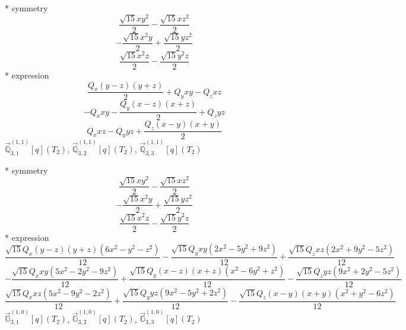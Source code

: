 \documentclass[fleqn,8pt]{jsarticle}
\begin{document}
\noindent\quad ** symmetry
\begin{dmath*}
\frac{\sqrt{15} x y^{2}}{2} - \frac{\sqrt{15} x z^{2}}{2}
\end{dmath*}
\begin{dmath*}
- \frac{\sqrt{15} x^{2} y}{2} + \frac{\sqrt{15} y z^{2}}{2}
\end{dmath*}
\begin{dmath*}
\frac{\sqrt{15} x^{2} z}{2} - \frac{\sqrt{15} y^{2} z}{2}
\end{dmath*}
\noindent\quad ** expression
\begin{dmath*}
\frac{Q_{x} \left(y - z\right) \left(y + z\right)}{2} + Q_{y} x y - Q_{z} x z
\end{dmath*}
\begin{dmath*}
- Q_{x} x y - \frac{Q_{y} \left(x - z\right) \left(x + z\right)}{2} + Q_{z} y z
\end{dmath*}
\begin{dmath*}
Q_{x} x z - Q_{y} y z + \frac{Q_{z} \left(x - y\right) \left(x + y\right)}{2}
\end{dmath*}
\noindent\quad $\vec{\mathbb{Q}}_{3,1}^{(1,1)}[q](T_{2})$, $\vec{\mathbb{Q}}_{3,2}^{(1,1)}[q](T_{2})$, $\vec{\mathbb{Q}}_{3,3}^{(1,1)}[q](T_{2})$

\noindent\quad ** symmetry
\begin{dmath*}
\frac{\sqrt{15} x y^{2}}{2} - \frac{\sqrt{15} x z^{2}}{2}
\end{dmath*}
\begin{dmath*}
- \frac{\sqrt{15} x^{2} y}{2} + \frac{\sqrt{15} y z^{2}}{2}
\end{dmath*}
\begin{dmath*}
\frac{\sqrt{15} x^{2} z}{2} - \frac{\sqrt{15} y^{2} z}{2}
\end{dmath*}
\noindent\quad ** expression
\begin{dmath*}
\frac{\sqrt{15} Q_{x} \left(y - z\right) \left(y + z\right) \left(6 x^{2} - y^{2} - z^{2}\right)}{12} - \frac{\sqrt{15} Q_{y} x y \left(2 x^{2} - 5 y^{2} + 9 z^{2}\right)}{12} + \frac{\sqrt{15} Q_{z} x z \left(2 x^{2} + 9 y^{2} - 5 z^{2}\right)}{12}
\end{dmath*}
\begin{dmath*}
- \frac{\sqrt{15} Q_{x} x y \left(5 x^{2} - 2 y^{2} - 9 z^{2}\right)}{12} + \frac{\sqrt{15} Q_{y} \left(x - z\right) \left(x + z\right) \left(x^{2} - 6 y^{2} + z^{2}\right)}{12} - \frac{\sqrt{15} Q_{z} y z \left(9 x^{2} + 2 y^{2} - 5 z^{2}\right)}{12}
\end{dmath*}
\begin{dmath*}
\frac{\sqrt{15} Q_{x} x z \left(5 x^{2} - 9 y^{2} - 2 z^{2}\right)}{12} + \frac{\sqrt{15} Q_{y} y z \left(9 x^{2} - 5 y^{2} + 2 z^{2}\right)}{12} - \frac{\sqrt{15} Q_{z} \left(x - y\right) \left(x + y\right) \left(x^{2} + y^{2} - 6 z^{2}\right)}{12}
\end{dmath*}
\noindent\quad $\vec{\mathbb{G}}_{3,1}^{(1,0)}[q](T_{2})$, $\vec{\mathbb{G}}_{3,2}^{(1,0)}[q](T_{2})$, $\vec{\mathbb{G}}_{3,3}^{(1,0)}[q](T_{2})$
\end{document}
